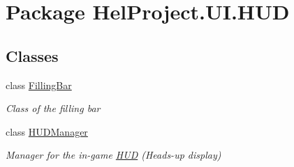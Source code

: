 \hypertarget{namespace_hel_project_1_1_u_i_1_1_h_u_d}{}\section{Package Hel\+Project.\+U\+I.\+H\+U\+D}
\label{namespace_hel_project_1_1_u_i_1_1_h_u_d}
\subsection*{Classes}
\begin{DoxyCompactItemize}
\item 
class \hyperlink{class_hel_project_1_1_u_i_1_1_h_u_d_1_1_filling_bar}{Filling\+Bar}
\begin{DoxyCompactList}\small\item\em Class of the filling bar \end{DoxyCompactList}\item 
class \hyperlink{class_hel_project_1_1_u_i_1_1_h_u_d_1_1_h_u_d_manager}{H\+U\+D\+Manager}
\begin{DoxyCompactList}\small\item\em Manager for the in-\/game \hyperlink{namespace_hel_project_1_1_u_i_1_1_h_u_d}{H\+U\+D} (Heads-\/up display) \end{DoxyCompactList}\end{DoxyCompactItemize}
